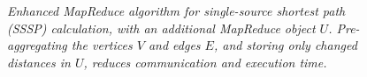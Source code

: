 \begin{figure}[htb]
\begin{center}
{\begin{minipage}{\textwidth}
\begin{tabbing}
  \end{tabbing}
 \end{minipage}}\end{center}

 \caption{\it Enhanced MapReduce algorithm for single-source shortest
 path (SSSP) calculation, with an additional MapReduce object $U$.
 Pre-aggregating the vertices $V$ and edges $E$, and storing only
 changed distances in $U$, reduces communication and execution time.}

 \label{fig:sssp2}
\end{figure}
